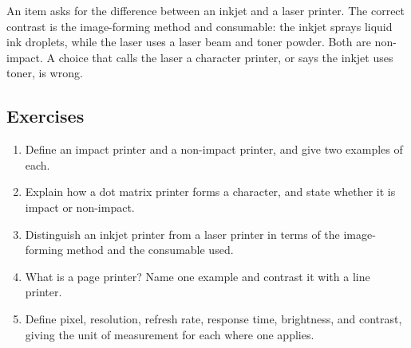 \begin{example}
An item asks for the difference between an inkjet and a laser printer. The
correct contrast is the image-forming method and consumable: the inkjet sprays
liquid ink droplets, while the laser uses a laser beam and toner powder.
Both are non-impact. A choice that calls the laser a character printer, or
says the inkjet uses toner, is wrong.
\end{example}

\subsection*{Exercises}
\begin{enumerate}[label=\arabic*.]
  \item Define an impact printer and a non-impact printer, and give two
    examples of each.
  \item Explain how a dot matrix printer forms a character, and state whether
    it is impact or non-impact.
  \item Distinguish an inkjet printer from a laser printer in terms of the
    image-forming method and the consumable used.
  \item What is a page printer? Name one example and contrast it with a line
    printer.
  \item Define pixel, resolution, refresh rate, response time, brightness,
    and contrast, giving the unit of measurement for each where one applies.
\end{enumerate}

